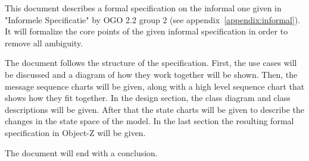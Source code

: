 This document describes a formal specification on the informal one given in "Informele Specificatie" by OGO 2.2 group 2 (see appendix~\ref{appendix:informal}).
It will formalize the core points of the given informal specification in order to remove all ambiguity.

The document follows the structure of the specification. First, the use cases will be discussed and a diagram of how they work together will be shown. Then, the message sequence charts will be given, along with a high level sequence chart that shows how they fit together. In the design section, the class diagram and class descriptions will be given. After that the state charts will be given to describe the changes in the state space of the model. In the last section the resulting formal specification in Object-Z will be given.

The document will end with a conclusion.
